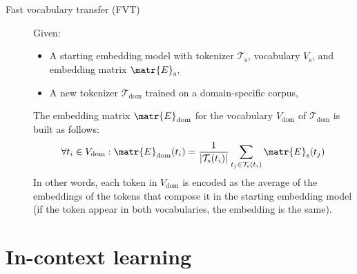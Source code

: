 \begin{description}
        \begin{description}
            \item[Fast vocabulary transfer (FVT)] 
                Given:
                \begin{itemize}
                    \item A starting embedding model with tokenizer $\mathcal{T}_\text{s}$, vocabulary $V_\text{s}$, and embedding matrix $\matr{E}_\text{s}$,
                    \item A new tokenizer $\mathcal{T}_\text{dom}$ trained on a domain-specific corpus,
                \end{itemize}
                The embedding matrix $\matr{E}_\text{dom}$ for the vocabulary $V_\text{dom}$ of $\mathcal{T}_\text{dom}$ is built as follows:
                \[ 
                    \forall t_i \in V_\text{dom}: \matr{E}_\text{dom}(t_i) = \frac{1}{|\mathcal{T}_\text{s}(t_i)|} \sum_{t_j \in \mathcal{T}_\text{s}(t_i)}\matr{E}_\text{s}(t_j)
                \]
                In other words, each token in $V_\text{dom}$ is encoded as the average of the embeddings of the tokens that compose it in the starting embedding model (if the token appear in both vocabularies, the embedding is the same).
        \end{description}
\end{description}



\section{In-context learning}


